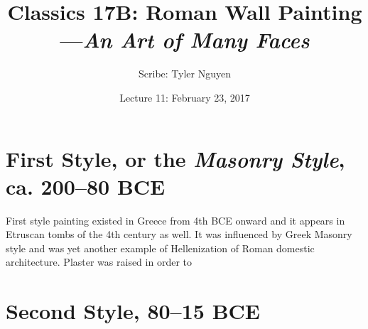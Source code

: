 \documentclass{article}
\begin{document}
\title{Classics 17B: Roman Wall Painting---\textit{An Art of Many Faces}}
\author{Scribe: Tyler Nguyen}
\date{Lecture 11: February 23, 2017}
\maketitle
\section{First Style, or the \textit{Masonry Style}, ca. 200--80 BCE}
First style painting existed in Greece from 4th BCE onward and it appears in Etruscan tombs of the 4th century as well.  It was influenced by Greek Masonry style and was yet another example of Hellenization of Roman domestic architecture.  Plaster was raised in order to
\section{Second Style, 80--15 BCE}
\end{document}
